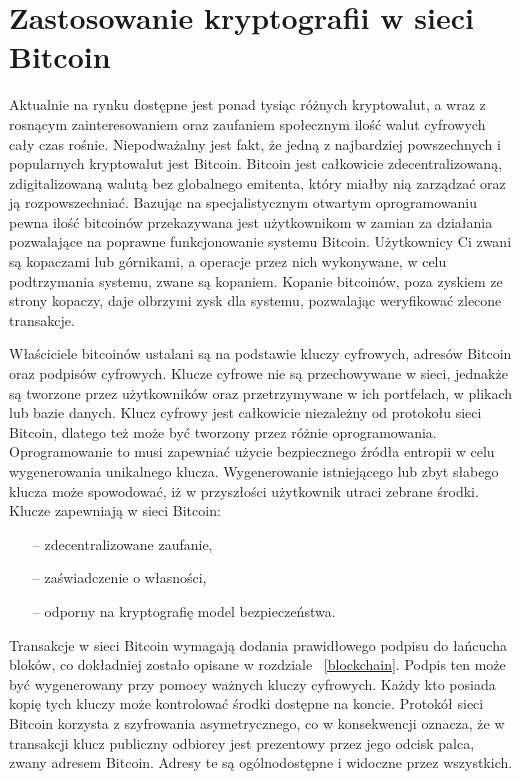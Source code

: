 \documentclass[12pt, twoside, final, openany]{mgr}
\begin{document}
\section{Zastosowanie kryptografii w sieci Bitcoin} \label{sec:zastosowanieKryptografii}
\indent Aktualnie na rynku dostępne jest ponad tysiąc różnych kryptowalut, a wraz z rosnącym zainteresowaniem oraz zaufaniem społecznym ilość walut cyfrowych cały czas rośnie\cite{Zcoinmarketcap}. Niepodważalny jest fakt, że jedną z najbardziej powszechnych i popularnych kryptowalut jest Bitcoin. Bitcoin jest całkowicie zdecentralizowaną, zdigitalizowaną walutą bez globalnego emitenta, który miałby nią zarządzać oraz ją rozpowszechniać. Bazując na specjalistycznym otwartym oprogramowaniu pewna ilość bitcoinów przekazywana jest użytkownikom w zamian za działania pozwalające na poprawne funkcjonowanie systemu Bitcoin. Użytkownicy Ci zwani są kopaczami lub górnikami, a operacje przez nich wykonywane, w celu podtrzymania systemu, zwane są kopaniem. Kopanie bitcoinów, poza zyskiem ze strony kopaczy, daje olbrzymi zysk dla systemu, pozwalając weryfikować zlecone transakcje.

\indent Właściciele bitcoinów ustalani są na podstawie kluczy cyfrowych, adresów Bitcoin oraz podpisów cyfrowych. Klucze cyfrowe nie są przechowywane w sieci, jednakże są tworzone przez użytkowników oraz przetrzymywane w ich portfelach, w plikach lub bazie danych. Klucz cyfrowy jest całkowicie niezależny od protokołu sieci Bitcoin, dlatego też może być tworzony przez różnie oprogramowania. Oprogramowanie to musi zapewniać użycie bezpiecznego źródła entropii w celu wygenerowania unikalnego klucza\cite{Mastering}. Wygenerowanie istniejącego lub zbyt słabego klucza może spowodować, iż w przyszłości użytkownik utraci zebrane środki. Klucze zapewniają w sieci Bitcoin:
\begin{itemize}
\item[--] zdecentralizowane zaufanie,
\item[--] zaświadczenie o własności,
\item[--] odporny na kryptografię model bezpieczeństwa.
\end{itemize}
Transakcje w sieci Bitcoin wymagają dodania prawidłowego podpisu do łańcucha bloków, co dokładniej zostało opisane w rozdziale ~\ref{blockchain}. Podpis ten może być wygenerowany przy pomocy ważnych kluczy cyfrowych. Każdy kto posiada kopię tych kluczy może kontrolować środki dostępne na koncie. Protokół sieci Bitcoin korzysta z szyfrowania asymetrycznego, co w konsekwencji oznacza, że w transakcji klucz publiczny odbiorcy jest prezentowy przez jego odcisk palca, zwany adresem Bitcoin. Adresy te są ogólnodostępne i widoczne przez wszystkich\cite{blockchaininfo}. 
\end{document}

